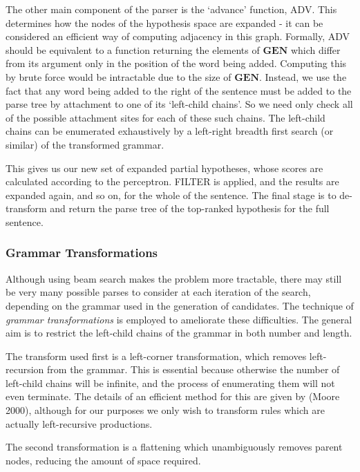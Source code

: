 \documentclass[11pt]{article}
\begin{document}
The other main component of the parser is the `advance' function, ADV. This
determines how the nodes of the hypothesis space are expanded - it can be
considered an efficient way of computing adjacency in this graph. Formally, ADV
should be equivalent to a function returning the elements of $\textbf{GEN}$
which differ from its argument only in the position of the word being added.
Computing this by brute force would be intractable due to the size of
$\textbf{GEN}$. Instead, we use the fact that any word being added to the right
of the sentence must be added to the parse tree by attachment to one of its
`left-child chains'. So we need only check all of the possible attachment sites
for each of these such chains. The left-child chains can be enumerated
exhaustively by a left-right breadth first search (or similar) of the
transformed grammar.

This gives us our new set of expanded partial hypotheses, whose scores are
calculated according to the perceptron. FILTER is applied, and the results are
expanded again, and so on, for the whole of the sentence.  The final stage is
to de-transform and return the parse tree of the top-ranked hypothesis for the
full sentence.

\subsubsection*{Grammar Transformations}

Although using beam search makes the problem more tractable, there may still be
very many possible parses to consider at each iteration of the search, depending
on the grammar used in the generation of candidates. The technique of
\emph{grammar transformations} is employed to ameliorate these difficulties.
The general aim is to restrict the left-child chains of the grammar in both
number and length.

The transform used first is a left-corner transformation, which removes
left-recursion from the grammar. This is essential because otherwise the number
of left-child chains will be infinite, and the process of enumerating them will
not even terminate\cite{Roark2001}. The details of an efficient method for this
are given by (Moore 2000)\cite{Moore2000}, although for our purposes we only
wish to transform rules which are actually left-recursive productions.

The second transformation is a flattening which unambiguously removes parent nodes, reducing the amount of space required.
\end{document}
